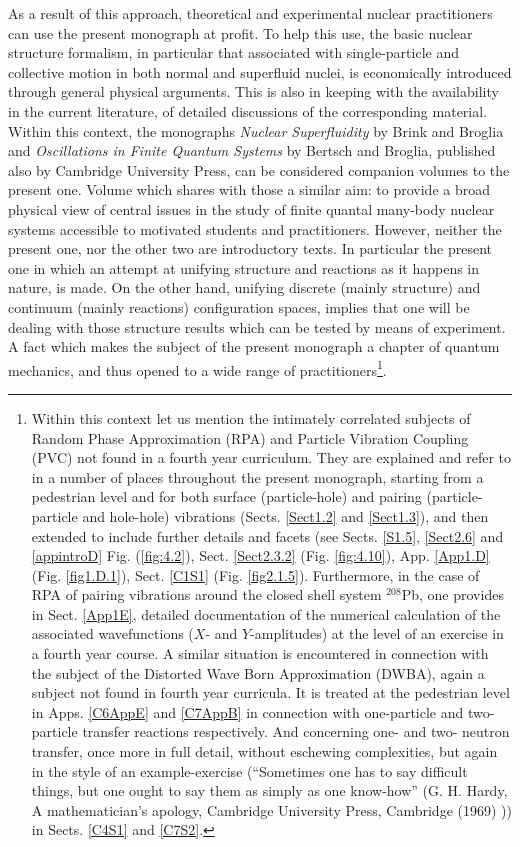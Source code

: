 As a result of this approach, theoretical and experimental nuclear practitioners can use the present monograph at profit. To help this use, the basic nuclear structure formalism, in particular that associated with single-particle and collective motion in both normal and superfluid nuclei, is economically introduced through general physical arguments. This is also in keeping with the availability in the current literature, of detailed discussions of the corresponding material. Within this context, the monographs \emph{Nuclear Superfluidity} by Brink and Broglia and \emph{Oscillations in Finite Quantum Systems}  by Bertsch and Broglia, published also by Cambridge University Press, can be considered companion volumes to the present one. Volume which shares with those a similar aim: to provide a broad physical view of central issues in the study of finite quantal many-body nuclear systems accessible to motivated students and practitioners. However, neither the present one, nor the other two are introductory texts. In particular the present one in which an attempt at unifying structure and reactions as it happens in nature, is made. On the other hand, unifying discrete (mainly structure) and continuum  (mainly reactions) configuration spaces, implies that one will be dealing with those structure results which can be tested by means of experiment. A fact which makes the subject of the present monograph a chapter of quantum mechanics, and thus opened to a wide range of practitioners\footnote{Within this context let us mention the intimately correlated subjects of Random Phase Approximation (RPA) and Particle Vibration Coupling (PVC) not found in a fourth year curriculum. They are explained and refer to in a number of places throughout the present monograph, starting from a pedestrian level and for both surface (particle-hole) and pairing (particle-particle and hole-hole) vibrations (Sects. \ref{Sect1.2} and \ref{Sect1.3}), and then extended to include further details and facets (see Sects. \ref{S1.5}, \ref{Sect2.6} and \ref{appintroD} Fig. (\ref{fig:4.2}), Sect. \ref{Sect2.3.2} (Fig. \ref{fig:4.10}), App. \ref{App1.D} (Fig. \ref{fig1.D.1}), Sect. \ref{C1S1} (Fig. \ref{fig2.1.5}). Furthermore, in the case of RPA of pairing vibrations around the closed shell system $^{208}$Pb, one provides in Sect. \ref{App1E}, detailed documentation of the numerical calculation of the associated wavefunctions ($X$- and $Y$-amplitudes) at the level of an exercise in a fourth year course. A similar situation is encountered in connection with the subject of the Distorted Wave Born Approximation (DWBA), again a subject not found in fourth year curricula. It is treated at the pedestrian level in Apps. \ref{C6AppE} and \ref{C7AppB} in connection with one-particle and two-particle transfer reactions respectively. And concerning one- and two- neutron transfer, once more in full detail, without eschewing complexities, but again in the style of an example-exercise (``Sometimes one has to say difficult things, but one ought to say them as simply as one know-how'' (G. H. Hardy, A mathematician's apology, Cambridge University Press, Cambridge (1969) )) in Sects. \ref{C4S1} and \ref{C7S2}.}.

